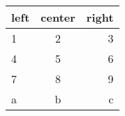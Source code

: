 \documentclass{article}
\begin{document}
  \begin{tabular}{lcr} \toprule
    left & center & right\\\midrule
    1 & 2 & 3\\
    4 & 5 & 6\\\midrule
    7 & 8 & 9\\
    a & b & c\\\bottomrule
  \end{tabular}
\end{document}
